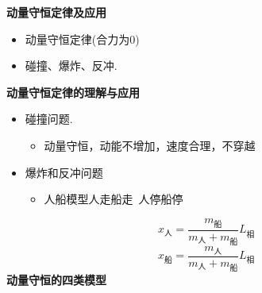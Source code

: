 \textbf{动量守恒定律及应用}
\begin{itemize}
\item 动量守恒定律\quad (合力为0)
\item 碰撞、爆炸、反冲.
\end{itemize}
\textbf{动量守恒定律的理解与应用}
\begin{itemize}
\item 碰撞问题.
  \begin{itemize}
  \item 动量守恒，动能不增加，速度合理，不穿越
  \end{itemize}
\end{itemize}
\begin{itemize}
\item 爆炸和反冲问题
  \begin{itemize}
  \item 人船模型\quad 人走船走\ 人停船停
  \end{itemize}
\end{itemize}
\[ x_{\text{人}}=\dfrac{m_{\text{船}}}{m_{\text{人}}+m_{\text{船}}}L_{\text{相}} \]
\[ x_{\text{船}}=\dfrac{m_{\text{人}}}{m_{\text{人}}+m_{\text{船}}}L_{\text{相}} \] %
\textbf{动量守恒的四类模型}

